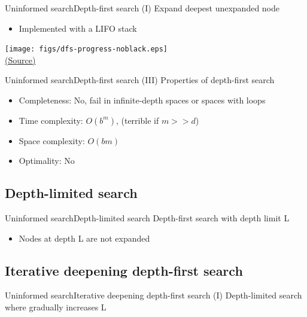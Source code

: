 \documentclass[10pt,compress]{beamer} %
\begin{document}
\begin{frame}{Uninformed search}{Depth-first search (I)}
    Expand deepest unexpanded node
    \begin{itemize}
        \item Implemented with a LIFO stack
    \end{itemize}
\end{frame}

\begin{frame}[plain]
      \begin{center}
          \texttt{[image: figs/dfs-progress-noblack.eps]}\\
          \tiny{\href{http://aima.cs.berkeley.edu/index.html}{(Source)}}
      \end{center}
\end{frame}

\begin{frame}{Uninformed search}{Depth-first search (III)}
      Properties of depth-first search
      \begin{itemize}
        \item Completeness: No, fail in infinite-depth spaces or spaces with loops
        \item Time complexity: $O(b^{m})$, (terrible if $m>>d$)
        \item Space complexity: $O(bm)$
        \item Optimality: No
      \end{itemize}
\end{frame}

\subsection{Depth-limited search}

\begin{frame}{Uninformed search}{Depth-limited search}
      Depth-first search with depth limit L
      \begin{itemize}
        \item Nodes at depth L are not expanded
      \end{itemize}
\end{frame}

\subsection{Iterative deepening depth-first search}

\begin{frame}{Uninformed search}{Iterative deepening depth-first search (I)}
    Depth-limited search where gradually increases L
\end{frame}
\end{document}
